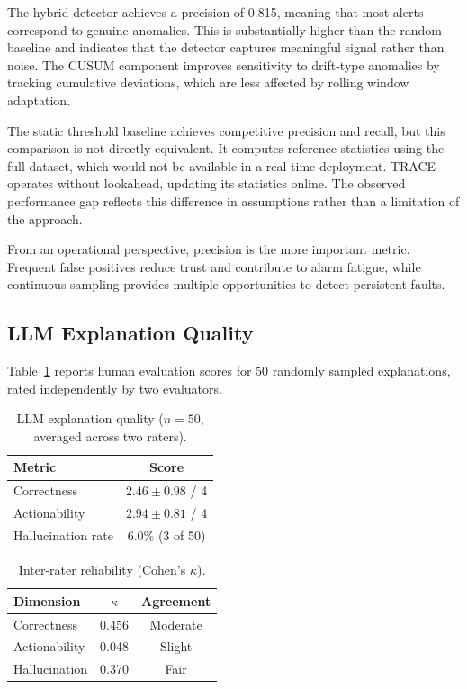\documentclass[11pt, a4paper]{article}
\begin{document}
The hybrid detector achieves a precision of 0.815, meaning that most
alerts correspond to genuine anomalies. This is substantially higher
than the random baseline and indicates that the detector captures
meaningful signal rather than noise. The CUSUM component improves
sensitivity to drift-type anomalies by tracking cumulative deviations,
which are less affected by rolling window adaptation.

The static threshold baseline achieves competitive precision and recall,
but this comparison is not directly equivalent. It computes reference
statistics using the full dataset, which would not be available in a
real-time deployment. TRACE operates without lookahead, updating its
statistics online. The observed performance gap reflects this difference
in assumptions rather than a limitation of the approach.

From an operational perspective, precision is the more important metric.
Frequent false positives reduce trust and contribute to alarm fatigue,
while continuous sampling provides multiple opportunities to detect
persistent faults.

\subsection{LLM Explanation Quality}

Table~\ref{tab:quality} reports human evaluation scores for 50 randomly
sampled explanations, rated independently by two evaluators.

\begin{table}[h]
\centering
\caption{LLM explanation quality ($n = 50$, averaged across two raters).}
\label{tab:quality}
\begin{tabular}{lc}
\toprule
\textbf{Metric} & \textbf{Score} \\
\midrule
Correctness        & $2.46 \pm 0.98$ / 4 \\
Actionability      & $2.94 \pm 0.81$ / 4 \\
Hallucination rate & 6.0\% (3 of 50)     \\
\bottomrule
\end{tabular}
\end{table}

\begin{table}[h]
\centering
\caption{Inter-rater reliability (Cohen's $\kappa$).}
\label{tab:kappa}
\begin{tabular}{lcc}
\toprule
\textbf{Dimension} & \textbf{$\kappa$} & \textbf{Agreement} \\
\midrule
Correctness   & 0.456 & Moderate \\
Actionability & 0.048 & Slight   \\
Hallucination & 0.370 & Fair     \\
\bottomrule
\end{tabular}
\end{table}
\end{document}

